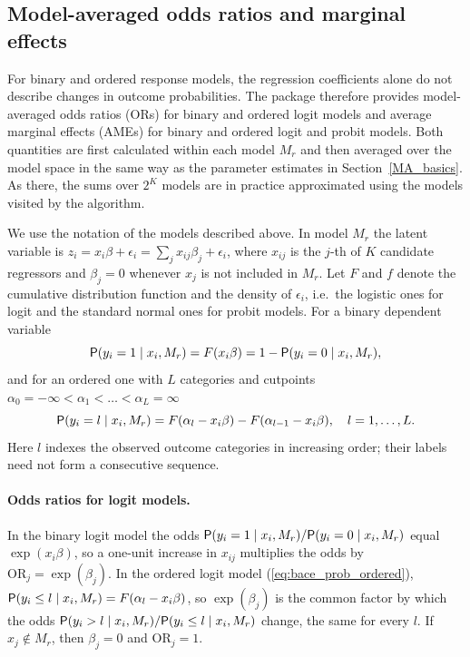 \subsection{Model-averaged odds ratios and marginal effects}
\label{sec:or_ame_theory}
For binary and ordered response models, the regression coefficients
alone do not describe changes in outcome probabilities. The
 package therefore provides model-averaged odds ratios
(ORs) for binary and ordered logit models and average marginal
effects (AMEs) for binary and ordered logit and probit models.
Both quantities are first calculated within each model $M_r$ and
then averaged over the model space in the same way as the
parameter estimates in Section~\ref{MA_basics}. As there, the sums
over $2^K$ models are in practice approximated using the models
visited by the \MCcube algorithm.

We use the notation of the models described above. In model $M_r$
the latent variable is $z_i=x_i\beta+\epsilon_i=\sum_{j}x_{ij}\beta_j+\epsilon_i$,
where $x_{ij}$ is the $j$-th of $K$ candidate regressors and
$\beta_j=0$ whenever $x_j$ is not included in $M_r$. Let $F$ and $f$
denote the cumulative distribution function and the density of
$\epsilon_i$, i.e.\ the logistic ones for logit and the standard normal
ones for probit models. For a binary dependent variable
\begin{equation}
	\mathsf{P}(y_i=1\mid x_i,M_r)=F(x_i\beta)=1-\mathsf{P}(y_i=0\mid x_i,M_r),
	\label{eq:bace_prob_binary}
\end{equation}
and for an ordered one with $L$ categories and cutpoints
$\alpha_0=-\infty<\alpha_1<\dots<\alpha_L=\infty$
\begin{equation}
	\mathsf{P}(y_i=l\mid x_i,M_r)=F(\alpha_l-x_i\beta)-F(\alpha_{l-1}-x_i\beta),
	\quad l=1,\dots,L.
	\label{eq:bace_prob_ordered}
\end{equation}
Here $l$ indexes the observed outcome categories in increasing order;
their labels need not form a consecutive sequence.

\paragraph{Odds ratios for logit models.}
In the binary logit model the odds $\mathsf{P}(y_i=1\mid x_i,M_r)/\mathsf{P}(y_i=0\mid x_i,M_r)$
equal $\exp(x_i\beta)$, so a one-unit increase in $x_{ij}$ multiplies
the odds by $\mathrm{OR}_j=\exp(\beta_j)$. In the ordered logit model
(\ref{eq:bace_prob_ordered}), $\mathsf{P}(y_i\le l\mid x_i,M_r)=F(\alpha_l-x_i\beta)$,
so $\exp(\beta_j)$ is the common factor by which the odds
$\mathsf{P}(y_i>l\mid x_i,M_r)/\mathsf{P}(y_i\le l\mid x_i,M_r)$ change, the same
for every $l$. If $x_j\notin M_r$, then $\beta_j=0$ and $\mathrm{OR}_j=1$.

